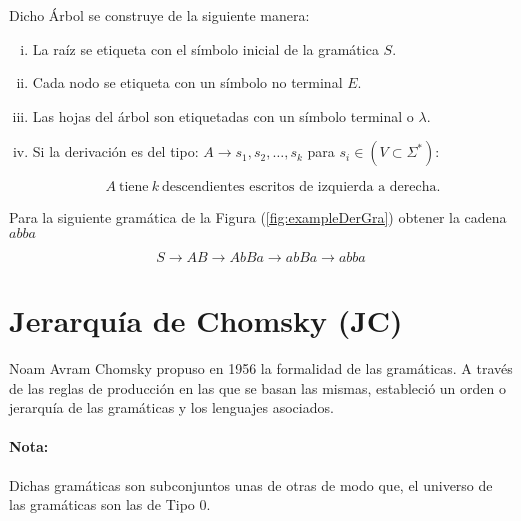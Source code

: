  Dicho Árbol se construye de la siguiente manera: 

\begin{enumerate}[i.]

\item La raíz se etiqueta con el símbolo inicial de la gramática $S$.

\item Cada nodo se etiqueta con un símbolo no terminal $E$.

\item Las hojas del árbol son etiquetadas con un símbolo terminal o $\lambda$.

\item Si la derivación es del tipo: $A \rightarrow s_1, s_2, \ldots, s_k$ para $s_i \in (V \subset \Sigma^*)$:

\begin{equation}
A\ \text{tiene}\ k\ \text{descendientes escritos de izquierda a derecha.} 
\end{equation}

 



\end{enumerate}




\ejem Para la siguiente gramática de la Figura (\ref{fig:exampleDerGra}) obtener la cadena $abba$

\begin{equation}
S \rightarrow AB \rightarrow AbBa \rightarrow abBa \rightarrow abba
\end{equation}




\section{Jerarquía de Chomsky (JC)}\label{sec:jerarquiaChomsky}

Noam Avram Chomsky propuso en 1956 la formalidad de las gramáticas. A través de las reglas de producción en las que se basan las mismas, estableció un orden o jerarquía de las gramáticas y los lenguajes asociados.

\paragraph*{Nota:} Dichas gramáticas son subconjuntos unas de otras de modo que, el universo de las gramáticas son las de Tipo 0.

